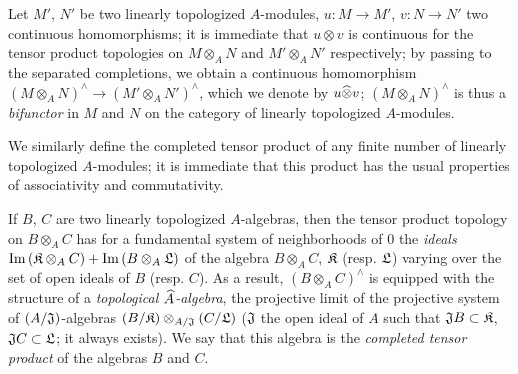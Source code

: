 \begin{env}[7.7.3]
\label{0.7.7.3}
Let $M'$, $N'$ be two linearly topologized $A$-modules, $u:M\to M'$, $v:N\to N'$ two continuous
homomorphisms; it is immediate that $u\otimes v$ is continuous for the tensor product topologies on
$M\otimes_A N$ and $M'\otimes_A N'$ respectively; by passing to the separated completions, we obtain
a continuous homomorphism $(M\otimes_A N)^\wedge\to(M'\otimes_A N')^\wedge$, which we denote by
$u\widehat{\otimes}v$; $(M\otimes_A N)^\wedge$ is thus a \emph{bifunctor} in $M$ and $N$ on the category
of linearly topologized $A$-modules.
\end{env}

\begin{env}[7.7.4]
\label{0.7.7.4}
We similarly define the completed tensor product of any finite number of linearly topologized
$A$-modules; it is immediate that this product has the usual properties of associativity and
commutativity.
\end{env}

\begin{env}[7.7.5]
\label{0.7.5.5}
If $B$, $C$ are two linearly topologized $A$-algebras, then the tensor product topology on
$B\otimes_A C$ has for a fundamental system of neighborhoods of $0$ the \emph{ideals}
${\mathop{\mathrm{Im}}\nolimits}\,(\mathfrak{K}\otimes_A C)+{\mathop{\mathrm{Im}}\nolimits}\,(B\otimes_A\mathfrak{L})$ of the algebra $B\otimes_A C$,
$\mathfrak{K}$ (resp. $\mathfrak{L}$) varying over the set of open ideals of $B$ (resp. $C$).
As a result, $(B\otimes_A C)^\wedge$ is equipped with the structure of a \emph{topological
$\widehat{A}$-algebra}, the projective limit of the projective system of $(A/\mathfrak{J})$-algebras
$(B/\mathfrak{K})\otimes_{A/\mathfrak{J}}(C/\mathfrak{L})$ ($\mathfrak{J}$ the open ideal of $A$
such that $\mathfrak{J}B\subset\mathfrak{K}$, $\mathfrak{J}C\subset\mathfrak{L}$; it always exists).
We say that this algebra is the \emph{completed tensor product} of the algebras $B$ and $C$.
\end{env}

